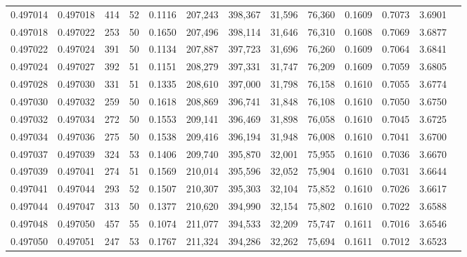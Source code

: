 \begin{tabular}{rrrrrrrrrrrrr}
0.497014 & 0.497018 & 414 &  52 &                                     0.1116 & 207,243 & 398,367 &  31,596 &  76,360 & 0.1609 & 0.7073 & 3.6901 \\
0.497018 & 0.497022 & 253 &  50 &                                     0.1650 & 207,496 & 398,114 &  31,646 &  76,310 & 0.1608 & 0.7069 & 3.6877 \\
0.497022 & 0.497024 & 391 &  50 &                                     0.1134 & 207,887 & 397,723 &  31,696 &  76,260 & 0.1609 & 0.7064 & 3.6841 \\
0.497024 & 0.497027 & 392 &  51 &                                     0.1151 & 208,279 & 397,331 &  31,747 &  76,209 & 0.1609 & 0.7059 & 3.6805 \\
0.497028 & 0.497030 & 331 &  51 &                                     0.1335 & 208,610 & 397,000 &  31,798 &  76,158 & 0.1610 & 0.7055 & 3.6774 \\
0.497030 & 0.497032 & 259 &  50 &                                     0.1618 & 208,869 & 396,741 &  31,848 &  76,108 & 0.1610 & 0.7050 & 3.6750 \\
0.497032 & 0.497034 & 272 &  50 &                                     0.1553 & 209,141 & 396,469 &  31,898 &  76,058 & 0.1610 & 0.7045 & 3.6725 \\
0.497034 & 0.497036 & 275 &  50 &                                     0.1538 & 209,416 & 396,194 &  31,948 &  76,008 & 0.1610 & 0.7041 & 3.6700 \\
0.497037 & 0.497039 & 324 &  53 &                                     0.1406 & 209,740 & 395,870 &  32,001 &  75,955 & 0.1610 & 0.7036 & 3.6670 \\
0.497039 & 0.497041 & 274 &  51 &                                     0.1569 & 210,014 & 395,596 &  32,052 &  75,904 & 0.1610 & 0.7031 & 3.6644 \\
0.497041 & 0.497044 & 293 &  52 &                                     0.1507 & 210,307 & 395,303 &  32,104 &  75,852 & 0.1610 & 0.7026 & 3.6617 \\
0.497044 & 0.497047 & 313 &  50 &                                     0.1377 & 210,620 & 394,990 &  32,154 &  75,802 & 0.1610 & 0.7022 & 3.6588 \\
0.497048 & 0.497050 & 457 &  55 &                                     0.1074 & 211,077 & 394,533 &  32,209 &  75,747 & 0.1611 & 0.7016 & 3.6546 \\
0.497050 & 0.497051 & 247 &  53 &                                     0.1767 & 211,324 & 394,286 &  32,262 &  75,694 & 0.1611 & 0.7012 & 3.6523 \\

\end{tabular}
